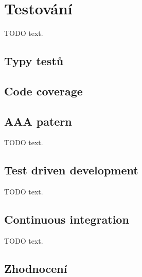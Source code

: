 \section{Testování}

TODO text.



\subsection{Typy testů}


\subsection{Code coverage}


\subsection{AAA patern}

TODO text.

\subsection{Test driven development}


TODO text.

\subsection{Continuous integration}

TODO text.

\subsection{Zhodnocení}

